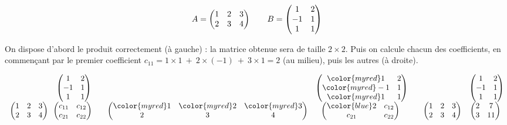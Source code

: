 \documentclass[11pt,class=report,crop=false]{standalone}
\begin{document}
\begin{exemple}
$$A =\begin{pmatrix}
1 & 2 & 3\cr
2 & 3 & 4\cr
\end{pmatrix}\qquad B =
\begin{pmatrix}
1&2\cr
-1&1 \cr
1&1\cr
\end{pmatrix}
$$


On dispose d'abord le produit correctement (à gauche) : la matrice obtenue
sera de taille $2\times2$.
Puis on calcule chacun des coefficients,
en commençant par le premier coefficient $c_{11} = 1\times 1\ +\ 2\times(-1)\ +\ 3\times1=2$ (au milieu),
puis les autres (à droite).

$$\begin{array}{cc}
  &  \begin{pmatrix}
1&2\cr
-1&1 \cr
1&1\cr
\end{pmatrix} \\
\begin{pmatrix}
1 & 2 & 3\cr
2 & 3& 4\cr
\end{pmatrix}
   &\!\!
 \begin{pmatrix} c_{11} & c_{12} \\ c_{21} & c_{22} \end{pmatrix}
  \end{array}
   \quad
 \begin{array}{cc}
  & \begin{pmatrix}
{\color{myred}1}&2\cr
{\color{myred}-1}&1 \cr
{\color{myred}1}&1\cr
\end{pmatrix}  \\
\begin{pmatrix}
{\color{myred}1} & {\color{myred}2} & {\color{myred}3}\cr
2 & 3& 4\cr
\end{pmatrix}
   &\!\! \begin{pmatrix} {\color{blue}2} & c_{12} \\ c_{21} & c_{22} \end{pmatrix}
  \end{array}
  \quad
 \begin{array}{cc}
  &
\begin{pmatrix}
1&2\cr
-1&1 \cr
1&1\cr
\end{pmatrix}\\
\begin{pmatrix}
1 & 2 & 3\cr
2 & 3& 4\cr
\end{pmatrix}
   &\!\! \begin{pmatrix} 2 & 7 \cr 3 & 11 \end{pmatrix}
  \end{array}
 $$


\end{exemple}
\end{document}
